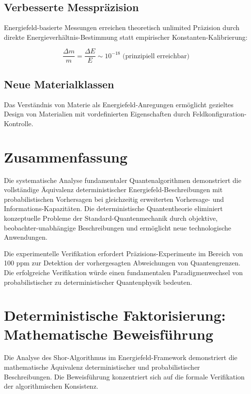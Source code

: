 \documentclass[12pt,a4paper]{report}
\begin{document}
	\subsection{Verbesserte Messpräzision}
	
	Energiefeld-basierte Messungen erreichen theoretisch unlimited Präzision durch direkte Energieverhältnis-Bestimmung statt empirischer Konstanten-Kalibrierung:
	
	\begin{equation}
		\frac{\Delta m}{m} = \frac{\Delta E}{E} \sim 10^{-18} \text{ (prinzipiell erreichbar)}
	\end{equation}
	
	\subsection{Neue Materialklassen}
	
	Das Verständnis von Materie als Energiefeld-Anregungen ermöglicht gezieltes Design von Materialien mit vordefinierten Eigenschaften durch Feldkonfiguration-Kontrolle.
	
	\section{Zusammenfassung}
	
	Die systematische Analyse fundamentaler Quantenalgorithmen demonstriert die vollständige Äquivalenz deterministischer Energiefeld-Beschreibungen mit probabilistischen Vorhersagen bei gleichzeitig erweiterten Vorhersage- und Informations-Kapazitäten. Die deterministische Quantentheorie eliminiert konzeptuelle Probleme der Standard-Quantenmechanik durch objektive, beobachter-unabhängige Beschreibungen und ermöglicht neue technologische Anwendungen.
	
	Die experimentelle Verifikation erfordert Präzisions-Experimente im Bereich von 100 ppm zur Detektion der vorhergesagten Abweichungen von Quantengrenzen. Die erfolgreiche Verifikation würde einen fundamentalen Paradigmenwechsel von probabilistischer zu deterministischer Quantenphysik bedeuten.
	\section{Deterministische Faktorisierung: Mathematische Beweisführung}
	
	Die Analyse des Shor-Algorithmus im Energiefeld-Framework demonstriert die mathematische Äquivalenz deterministischer und probabilistischer Beschreibungen. Die Beweisführung konzentriert sich auf die formale Verifikation der algorithmischen Konsistenz.
	
\end{document}
